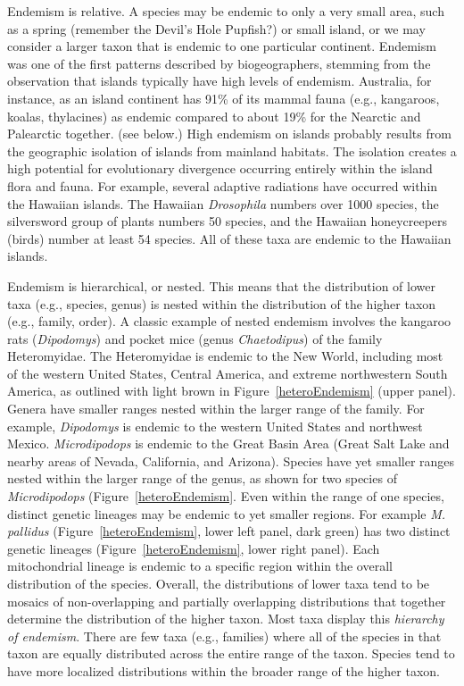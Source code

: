 \documentclass[11pt, hidelinks]{article}
\begin{document}
Endemism is relative. A  species may be endemic to only a very small area, such as a spring (remember the Devil's Hole Pupfish?) or small island, or we may consider a larger taxon that is endemic to one particular continent. Endemism was one of the first patterns described by biogeographers, stemming from the observation that islands typically have high levels of endemism.  Australia, for instance, as an island continent has 91\% of its mammal fauna (e.g., kangaroos, koalas, thylacines) as endemic compared to about 19\% for the Nearctic and Palearctic together.  (see below.)  High endemism on islands probably results from the geographic isolation of islands from mainland habitats. The isolation creates a high potential for evolutionary divergence occurring entirely within the island flora and fauna.  For example, several adaptive radiations have occurred within the Hawaiian islands.  The Hawaiian \emph{Drosophila} numbers over 1000 species, the silversword group of plants numbers 50 species, and the Hawaiian honeycreepers (birds) number at least 54 species.  All of these taxa are endemic to the Hawaiian islands. 

Endemism is hierarchical, or nested.  This means that the distribution of lower taxa (e.g., species, genus) is nested within the distribution of the higher taxon (e.g., family, order).  A classic example of nested endemism involves the kangaroo rats (\emph{Dipodomys}) and pocket mice (genus \emph{Chaetodipus}) of the family Heteromyidae.  The Heteromyidae is endemic to the New World, including most of the western United States, Central America, and extreme northwestern South America, as outlined with light brown in Figure~\ref{heteroEndemism} (upper panel).  Genera have smaller ranges nested within the larger range of the family. For example, \emph{Dipodomys} is endemic to the western United States and northwest Mexico. \emph{Microdipodops} is endemic to the Great Basin Area (Great Salt Lake and nearby areas of Nevada, California,  and Arizona). Species have yet smaller ranges nested within the larger range of the genus, as shown for two species of \emph{Microdipodops} (Figure~\ref{heteroEndemism}.  Even within the range of one species, distinct genetic lineages may be endemic to yet smaller regions. For example \emph{M. pallidus} (Figure~\ref{heteroEndemism}, lower left panel, dark green) has two distinct genetic lineages (Figure~\ref{heteroEndemism}, lower right panel).  Each mitochondrial lineage is endemic to a specific region within the overall distribution of the species. Overall, the distributions of lower taxa tend to be mosaics of non-overlapping and partially overlapping distributions that together determine the distribution of the higher taxon. Most taxa display this \emph{hierarchy of endemism}.  There are few taxa (e.g., families) where all of the species in that taxon are equally distributed across the entire range of the taxon.  Species tend to have more localized distributions within the broader range of the higher taxon.
\end{document}
